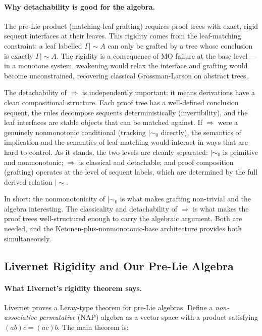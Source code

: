 \documentclass[a4paper,11pt]{report}
\newcommand{\ms}{\mathrel{\mid\!\sim}}
\newcommand{\mszero}{\mathrel{\mid\!\sim_{0}}}
\begin{document}
\paragraph{Why detachability is good for the algebra.}
The pre-Lie product (matching-leaf grafting) requires proof trees with exact, rigid
sequent interfaces at their leaves. This rigidity comes from the leaf-matching constraint:
a leaf labelled $\Gamma \ms A$ can only be grafted by a tree whose conclusion is exactly
$\Gamma \ms A$. The rigidity is a consequence of MO failure at the base level --- in a
monotone system, weakening would relax the interface and grafting would become
unconstrained, recovering classical Grossman-Larson on abstract trees.

The detachability of $\Rightarrow$ is independently important: it means derivations have
a clean compositional structure. Each proof tree has a well-defined conclusion sequent,
the rules decompose sequents deterministically (invertibility), and the leaf interfaces
are stable objects that can be matched against. If $\Rightarrow$ were a genuinely
nonmonotonic conditional (tracking $\mszero$ directly), the semantics of implication and
the semantics of leaf-matching would interact in ways that are hard to control. As it
stands, the two levels are cleanly separated: $\mszero$ is primitive and nonmonotonic;
$\Rightarrow$ is classical and detachable; and proof composition (grafting) operates at
the level of sequent labels, which are determined by the full derived relation $\ms$.

In short: the nonmonotonicity of $\mszero$ is what makes grafting non-trivial and the
algebra interesting. The classicality and detachability of $\Rightarrow$ is what makes
the proof trees well-structured enough to carry the algebraic argument. Both are needed,
and the Ketonen-plus-nonmonotonic-base architecture provides both simultaneously.

\subsection*{Livernet Rigidity and Our Pre-Lie Algebra}

\paragraph{What Livernet's rigidity theorem says.}
Livernet \cite{Livernet06} proves a Leray-type theorem for pre-Lie algebras. Define a
\emph{non-associative permutative} (NAP) algebra as a vector space with a product
satisfying $(ab)c = (ac)b$. The main theorem is:
\end{document}
